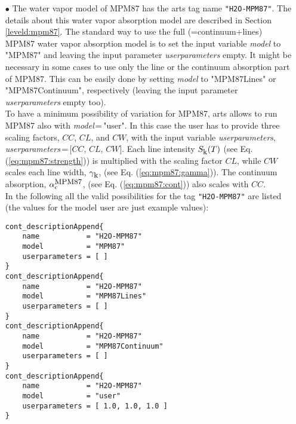 {\begin{itemize}
\item[$\bullet$] The water vapor model of MPM87 \citep{liebeandlayton:87} 
     has the arts tag name {\tt "H2O-MPM87"}. The details about this water 
     vapor absorption model are described in Section \ref{leveld:mpm87}. 
     The standard way to use the full (=continuum+lines) MPM87 water 
     vapor absorption model is to set the input variable {\it model} 
     to "MPM87" and leaving the input parameter {\it userparameters} empty. 
     It might be necessary in some cases to use only the line or the 
     continuum absorption part of MPM87. This can be easily done 
     by setting {\it model} to "MPM87Lines" or "MPM87Continuum", 
     respectively (leaving the input parameter {\it userparameters} 
     empty too).\\ To have a minimum possibility of variation for MPM87, 
     arts allows to run MPM87 also with {\it model}\,=\,"user". 
     In this case the user has to provide three scaling factors,  
     $CC$, $CL$, and $CW$, with the input variable {\it userparameters}, 
     {\it userparameters}\,=\,$[$$CC$, $CL$, $CW$$]$. 
     Each line intensity $S_{\mbox{\rm \small k}}(T)$ (see Eq. (\ref{eq:mpm87:strength})) 
     is multiplied with the scaling factor $CL$, while $CW$ scales 
     each line width, $\gamma_{\mbox{\rm \small k}}$, (see Eq. (\ref{eq:mpm87:gamma})). 
     The continuum absorption, $\alpha^{\mbox{\rm \small MPM87}}_{\rm c}$, 
     (see Eq. (\ref{eq:mpm87:cont})) also scales with $CC$.\\
     In the following all the valid possibilities for the
     tag {\tt "H2O-MPM87"} are listed (the values for the 
     model user are just example values): 
\begin{verbatim}
cont_descriptionAppend{
    name           = "H2O-MPM87"
    model          = "MPM87"
    userparameters = [ ]
}
cont_descriptionAppend{
    name           = "H2O-MPM87"
    model          = "MPM87Lines"
    userparameters = [ ]
}
cont_descriptionAppend{
    name           = "H2O-MPM87"
    model          = "MPM87Continuum"
    userparameters = [ ]
}
cont_descriptionAppend{
    name           = "H2O-MPM87"
    model          = "user"
    userparameters = [ 1.0, 1.0, 1.0 ]
}
\end{verbatim}


\end{itemize}}
